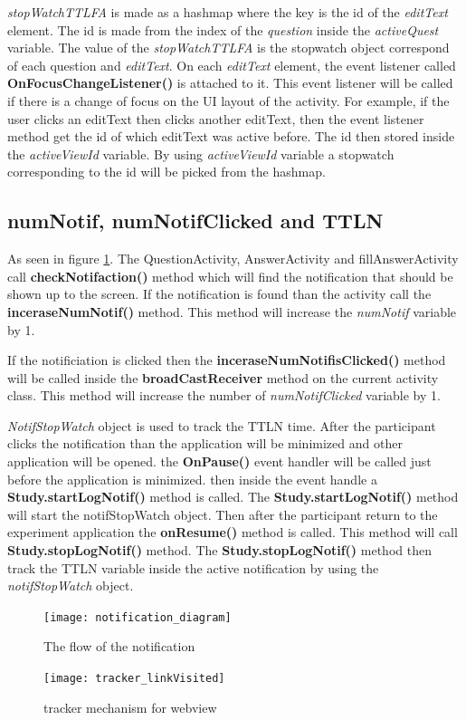 \textit{stopWatchTTLFA} is made as a hashmap where the key is the id of the \textit{editText} element.
The id is made from the index of the \textit{question} inside the \textit{activeQuest} variable.
The value of the \textit{stopWatchTTLFA} is the stopwatch object correspond of each question and \textit{editText}.
On each \textit{editText} element, the event listener called \textbf{OnFocusChangeListener()} is attached to it. This event listener will be called if there is a
change of focus on the UI layout of the activity. For example, if the user clicks an editText then clicks another editText, then the event listener
 method get the id of which editText was active before. The id then stored inside the \textit{activeViewId} variable.
By using \textit{activeViewId} variable a stopwatch corresponding to the id will be picked from the hashmap.


\subsection{numNotif, numNotifClicked and TTLN}
As seen in figure \ref{fig:NotificationFlo}. The QuestionActivity, AnswerActivity and fillAnswerActivity  call \textbf{checkNotifaction()} method
which will find the notification that should be shown up to the screen. If the notification is found than the activity call the \textbf{inceraseNumNotif()} method.
This method will increase the \textit{numNotif} variable by 1.

If the notificiation is clicked then the \textbf{inceraseNumNotifisClicked()} method will be called inside the \textbf{broadCastReceiver} method on the current activity class.
This method will increase the number of \textit{numNotifClicked} variable by 1.

\textit{NotifStopWatch} object is used to track the TTLN time.
After the participant clicks the notification than the application will be minimized and other
application will be opened.
 the \textbf{OnPause()} event handler will be called just before the application is minimized.
then inside the event handle a \textbf{Study.startLogNotif()} method is called. The \textbf{Study.startLogNotif()}  method will start the notifStopWatch object.
Then after the participant return to the experiment application the \textbf{onResume()} method is called.
This method will call \textbf{Study.stopLogNotif()} method.
The \textbf{Study.stopLogNotif()} method then track the TTLN variable inside the active notification
by using the \textit{notifStopWatch} object.


\begin{figure}
\begin{center}
\texttt{[image: notification\_diagram]}
\end{center}
\caption{The flow of the notification}
\label{fig:NotificationFlo}
\end{figure}
%
\begin{figure}
\begin{center}
\texttt{[image: tracker\_linkVisited]}
\end{center}
\caption{tracker mechanism for webview}
\label{fig:webViewTrack}
\end{figure}
